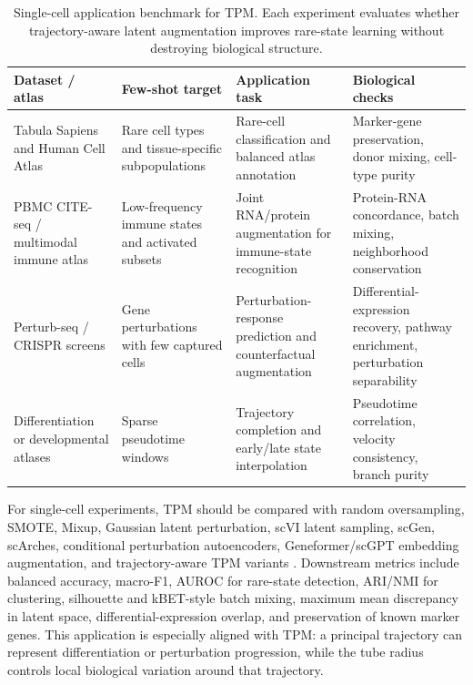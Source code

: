 \documentclass[preprint,12pt,number]{elsarticle}
\begin{document}
\begin{table}[t]
	\centering
	\caption{Single-cell application benchmark for TPM. Each experiment evaluates whether trajectory-aware latent augmentation improves rare-state learning without destroying biological structure.}
	\label{table:single_cell_benchmark}
	\small
	\setlength{\tabcolsep}{4.3pt}
	\renewcommand{\arraystretch}{1.18}
	\begin{tabular}{L{0.20\textwidth}L{0.22\textwidth}L{0.26\textwidth}L{0.23\textwidth}}
		\toprule
		Dataset / atlas & Few-shot target & Application task & Biological checks \\
		\midrule
		Tabula Sapiens and Human Cell Atlas \citep{tabula2022single, regev2017human} & Rare cell types and tissue-specific subpopulations & Rare-cell classification and balanced atlas annotation & Marker-gene preservation, donor mixing, cell-type purity \\
		PBMC CITE-seq / multimodal immune atlas \citep{hao2021integrated} & Low-frequency immune states and activated subsets & Joint RNA/protein augmentation for immune-state recognition & Protein-RNA concordance, batch mixing, neighborhood conservation \\
		Perturb-seq / CRISPR screens \citep{dixit2016perturbseq, replogle2022mapping} & Gene perturbations with few captured cells & Perturbation-response prediction and counterfactual augmentation & Differential-expression recovery, pathway enrichment, perturbation separability \\
		Differentiation or developmental atlases & Sparse pseudotime windows & Trajectory completion and early/late state interpolation & Pseudotime correlation, velocity consistency, branch purity \\
		\bottomrule
	\end{tabular}
\end{table}

For single-cell experiments, TPM should be compared with random oversampling, SMOTE, Mixup, Gaussian latent perturbation, scVI latent sampling, scGen, scArches, conditional perturbation autoencoders, Geneformer/scGPT embedding augmentation, and trajectory-aware TPM variants \citep{chawla2002smote, zhang2018mixup, lopez2018deep, lotfollahi2019scgen, lotfollahi2022mapping, lotfollahi2023predicting, theodoris2023transfer, cui2024scgpt}. Downstream metrics include balanced accuracy, macro-F1, AUROC for rare-state detection, ARI/NMI for clustering, silhouette and kBET-style batch mixing, maximum mean discrepancy in latent space, differential-expression overlap, and preservation of known marker genes. This application is especially aligned with TPM: a principal trajectory can represent differentiation or perturbation progression, while the tube radius controls local biological variation around that trajectory.
\end{document}
